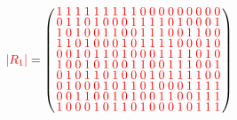 \documentclass{beamer}
\newcommand{\rred}[1]{\textcolor{red}{#1}}
\newcommand{\abs}[1]{|#1|}
\begin{document}
\begin{frame}

  \[
    \rred{\abs{R_1}} = 
    \left(
      \arraycolsep=1.25pt\def\arraystretch{0.625}
      \begin{array}{cccccccccccccccccc}
        \rred{1}&\rred{1}&\rred{1}&\rred{1}&\rred{1}&\rred{1}&\rred{1}&\rred{1}&\rred{1}&\rred{0}&\rred{0}&\rred{0}&\rred{0}&\rred{0}&\rred{0}&\rred{0}&\rred{0}&\rred{0}\\
        \rred{0}&\rred{1}&\rred{1}&\rred{0}&\rred{1}&\rred{0}&\rred{0}&\rred{0}&\rred{1}&\rred{1}&\rred{1}&\rred{1}&\rred{0}&\rred{1}&\rred{0}&\rred{0}&\rred{0}&\rred{1}\\
        \rred{1}&\rred{0}&\rred{1}&\rred{0}&\rred{0}&\rred{1}&\rred{1}&\rred{0}&\rred{0}&\rred{1}&\rred{1}&\rred{1}&\rred{0}&\rred{0}&\rred{1}&\rred{1}&\rred{0}&\rred{0}\\
        \rred{1}&\rred{1}&\rred{0}&\rred{1}&\rred{0}&\rred{0}&\rred{0}&\rred{1}&\rred{0}&\rred{1}&\rred{1}&\rred{1}&\rred{1}&\rred{0}&\rred{0}&\rred{0}&\rred{1}&\rred{0}\\
        \rred{0}&\rred{0}&\rred{1}&\rred{0}&\rred{1}&\rred{1}&\rred{0}&\rred{1}&\rred{0}&\rred{0}&\rred{0}&\rred{1}&\rred{1}&\rred{1}&\rred{1}&\rred{0}&\rred{1}&\rred{0}\\
        \rred{1}&\rred{0}&\rred{0}&\rred{1}&\rred{0}&\rred{1}&\rred{0}&\rred{0}&\rred{1}&\rred{1}&\rred{0}&\rred{0}&\rred{1}&\rred{1}&\rred{1}&\rred{0}&\rred{0}&\rred{1}\\
        \rred{0}&\rred{1}&\rred{0}&\rred{1}&\rred{1}&\rred{0}&\rred{1}&\rred{0}&\rred{0}&\rred{0}&\rred{1}&\rred{0}&\rred{1}&\rred{1}&\rred{1}&\rred{1}&\rred{0}&\rred{0}\\
        \rred{0}&\rred{1}&\rred{0}&\rred{0}&\rred{0}&\rred{1}&\rred{0}&\rred{1}&\rred{1}&\rred{0}&\rred{1}&\rred{0}&\rred{0}&\rred{0}&\rred{1}&\rred{1}&\rred{1}&\rred{1}\\
        \rred{0}&\rred{0}&\rred{1}&\rred{1}&\rred{0}&\rred{0}&\rred{1}&\rred{0}&\rred{1}&\rred{0}&\rred{0}&\rred{1}&\rred{1}&\rred{0}&\rred{0}&\rred{1}&\rred{1}&\rred{1}\\
        \rred{1}&\rred{0}&\rred{0}&\rred{0}&\rred{1}&\rred{0}&\rred{1}&\rred{1}&\rred{0}&\rred{1}&\rred{0}&\rred{0}&\rred{0}&\rred{1}&\rred{0}&\rred{1}&\rred{1}&\rred{1}\\
      \end{array}
    \right)
  \]
  
\end{frame}
\end{document}
